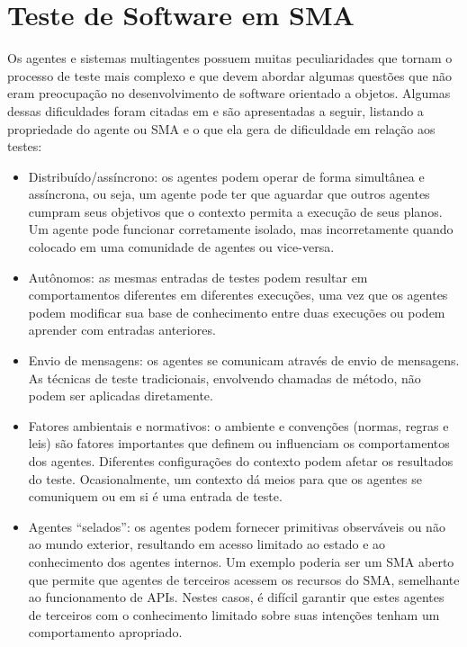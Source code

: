 \section{Teste de Software em SMA} \label{sec:testesma}

Os agentes e sistemas multiagentes possuem muitas peculiaridades que tornam o processo de teste mais complexo e que devem abordar algumas questões que não eram preocupação no desenvolvimento de software orientado a objetos. Algumas dessas dificuldades foram citadas em \cite{rouff2002test,houhamdi2011multi,nguyen2009thesis} e são apresentadas a seguir, listando a propriedade do agente ou SMA e o que ela gera de dificuldade em relação aos testes:

\begin{itemize}
\item Distribuído/assíncrono: os agentes podem operar de forma simultânea e assíncrona, ou seja, um agente pode ter que aguardar que outros agentes cumpram seus objetivos que o contexto permita a execução de seus planos. Um agente pode funcionar corretamente isolado, mas incorretamente quando colocado em uma comunidade de agentes ou vice-versa.
\item Autônomos: as mesmas entradas de testes podem resultar em comportamentos diferentes em diferentes execuções, uma vez que os agentes podem modificar sua base de conhecimento entre duas execuções ou podem aprender com entradas anteriores.
\item Envio de mensagens: os agentes se comunicam através de envio de mensagens. As técnicas de teste tradicionais, envolvendo chamadas de método, não podem ser aplicadas diretamente.
\item Fatores ambientais e normativos: o ambiente e convenções (normas, regras e leis) são fatores importantes que definem ou influenciam os comportamentos dos agentes. Diferentes configurações do contexto podem afetar os resultados do teste. Ocasionalmente, um contexto dá meios para que os agentes se comuniquem ou em si é uma entrada de teste.
\item Agentes “selados”: os agentes podem fornecer primitivas observáveis ou não ao mundo exterior, resultando em acesso limitado ao estado e ao conhecimento dos agentes internos. Um exemplo poderia ser um SMA aberto que permite que agentes de terceiros acessem os recursos do SMA, semelhante ao funcionamento de APIs. Nestes casos, é difícil garantir que estes agentes de terceiros com o conhecimento limitado sobre suas intenções tenham um comportamento apropriado.
\end{itemize}


